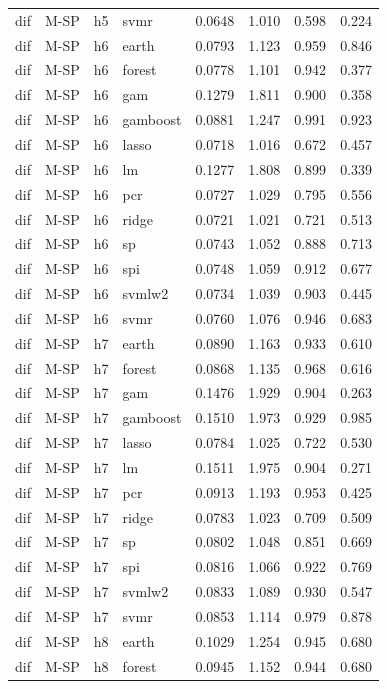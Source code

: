 \begin{ThreePartTable}
\begin{longtable}[t]{llclcccc}
dif & M-SP & h5 & svmr & 0.0648 & 1.010 & 0.598 & 0.224\\
\addlinespace
dif & M-SP & h6 & earth & 0.0793 & 1.123 & 0.959 & 0.846\\
dif & M-SP & h6 & forest & 0.0778 & 1.101 & 0.942 & 0.377\\
dif & M-SP & h6 & gam & 0.1279 & 1.811 & 0.900 & 0.358\\
dif & M-SP & h6 & gamboost & 0.0881 & 1.247 & 0.991 & 0.923\\
dif & M-SP & h6 & lasso & 0.0718 & 1.016 & 0.672 & 0.457\\
dif & M-SP & h6 & lm & 0.1277 & 1.808 & 0.899 & 0.339\\
dif & M-SP & h6 & pcr & 0.0727 & 1.029 & 0.795 & 0.556\\
dif & M-SP & h6 & ridge & 0.0721 & 1.021 & 0.721 & 0.513\\
dif & M-SP & h6 & sp & 0.0743 & 1.052 & 0.888 & 0.713\\
dif & M-SP & h6 & spi & 0.0748 & 1.059 & 0.912 & 0.677\\
dif & M-SP & h6 & svmlw2 & 0.0734 & 1.039 & 0.903 & 0.445\\
dif & M-SP & h6 & svmr & 0.0760 & 1.076 & 0.946 & 0.683\\
\addlinespace
dif & M-SP & h7 & earth & 0.0890 & 1.163 & 0.933 & 0.610\\
dif & M-SP & h7 & forest & 0.0868 & 1.135 & 0.968 & 0.616\\
dif & M-SP & h7 & gam & 0.1476 & 1.929 & 0.904 & 0.263\\
dif & M-SP & h7 & gamboost & 0.1510 & 1.973 & 0.929 & 0.985\\
dif & M-SP & h7 & lasso & 0.0784 & 1.025 & 0.722 & 0.530\\
dif & M-SP & h7 & lm & 0.1511 & 1.975 & 0.904 & 0.271\\
dif & M-SP & h7 & pcr & 0.0913 & 1.193 & 0.953 & 0.425\\
dif & M-SP & h7 & ridge & 0.0783 & 1.023 & 0.709 & 0.509\\
dif & M-SP & h7 & sp & 0.0802 & 1.048 & 0.851 & 0.669\\
dif & M-SP & h7 & spi & 0.0816 & 1.066 & 0.922 & 0.769\\
dif & M-SP & h7 & svmlw2 & 0.0833 & 1.089 & 0.930 & 0.547\\
dif & M-SP & h7 & svmr & 0.0853 & 1.114 & 0.979 & 0.878\\
\addlinespace
dif & M-SP & h8 & earth & 0.1029 & 1.254 & 0.945 & 0.680\\
dif & M-SP & h8 & forest & 0.0945 & 1.152 & 0.944 & 0.680\\

\end{longtable}
\end{ThreePartTable}
